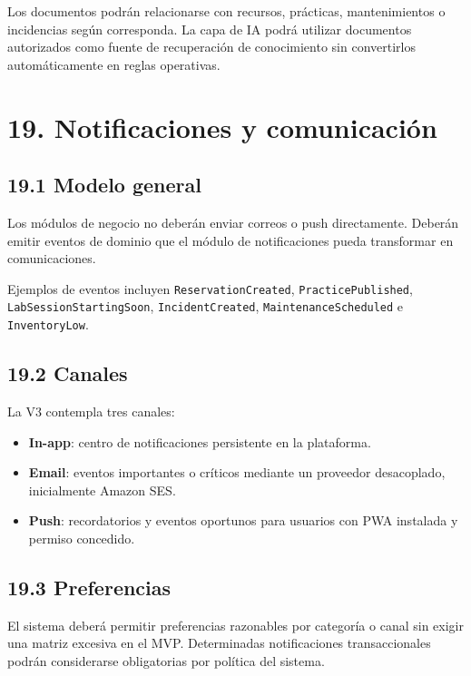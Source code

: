 \documentclass[12pt]{article}
\begin{document}
Los documentos podrán relacionarse con recursos, prácticas, mantenimientos o incidencias según corresponda. La capa de IA podrá utilizar documentos autorizados como fuente de recuperación de conocimiento sin convertirlos automáticamente en reglas operativas.

\section*{19. Notificaciones y comunicación}

\subsection*{19.1 Modelo general}

Los módulos de negocio no deberán enviar correos o push directamente. Deberán emitir eventos de dominio que el módulo de notificaciones pueda transformar en comunicaciones.

Ejemplos de eventos incluyen \texttt{ReservationCreated}, \texttt{PracticePublished}, \texttt{LabSessionStartingSoon}, \texttt{IncidentCreated}, \texttt{MaintenanceScheduled} e \texttt{InventoryLow}.

\subsection*{19.2 Canales}

La V3 contempla tres canales:

\begin{itemize}[leftmargin=1.2cm]
    \item \textbf{In-app}: centro de notificaciones persistente en la plataforma.
    \item \textbf{Email}: eventos importantes o críticos mediante un proveedor desacoplado, inicialmente Amazon SES.
    \item \textbf{Push}: recordatorios y eventos oportunos para usuarios con PWA instalada y permiso concedido.
\end{itemize}

\subsection*{19.3 Preferencias}

El sistema deberá permitir preferencias razonables por categoría o canal sin exigir una matriz excesiva en el MVP. Determinadas notificaciones transaccionales podrán considerarse obligatorias por política del sistema.
\end{document}
